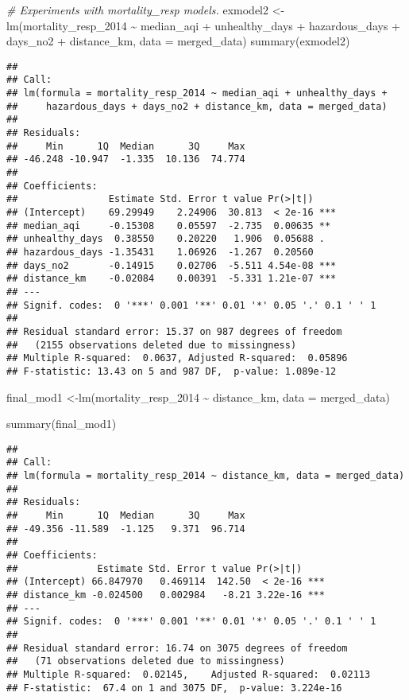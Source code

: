 \documentclass[
]{article}
\newenvironment{Shaded}{\begin{snugshade}}{\end{snugshade}}
\newcommand{\AttributeTok}[1]{\textcolor[rgb]{0.77,0.63,0.00}{#1}}
\newcommand{\CommentTok}[1]{\textcolor[rgb]{0.56,0.35,0.01}{\textit{#1}}}
\newcommand{\FunctionTok}[1]{\textcolor[rgb]{0.00,0.00,0.00}{#1}}
\newcommand{\NormalTok}[1]{#1}
\newcommand{\OtherTok}[1]{\textcolor[rgb]{0.56,0.35,0.01}{#1}}
\newcommand{\SpecialCharTok}[1]{\textcolor[rgb]{0.00,0.00,0.00}{#1}}
\begin{document}
\begin{Shaded}
\begin{Highlighting}[]
\CommentTok{\# Experiments with mortality\_resp models. }
\NormalTok{exmodel2 }\OtherTok{\textless{}{-}} \FunctionTok{lm}\NormalTok{(mortality\_resp\_2014 }\SpecialCharTok{\textasciitilde{}}\NormalTok{ median\_aqi }\SpecialCharTok{+}\NormalTok{ unhealthy\_days }\SpecialCharTok{+}\NormalTok{ hazardous\_days }\SpecialCharTok{+}\NormalTok{ days\_no2 }\SpecialCharTok{+}\NormalTok{ distance\_km, }\AttributeTok{data =}\NormalTok{ merged\_data)}
\FunctionTok{summary}\NormalTok{(exmodel2)}
\end{Highlighting}
\end{Shaded}

\begin{verbatim}
## 
## Call:
## lm(formula = mortality_resp_2014 ~ median_aqi + unhealthy_days + 
##     hazardous_days + days_no2 + distance_km, data = merged_data)
## 
## Residuals:
##     Min      1Q  Median      3Q     Max 
## -46.248 -10.947  -1.335  10.136  74.774 
## 
## Coefficients:
##                Estimate Std. Error t value Pr(>|t|)    
## (Intercept)    69.29949    2.24906  30.813  < 2e-16 ***
## median_aqi     -0.15308    0.05597  -2.735  0.00635 ** 
## unhealthy_days  0.38550    0.20220   1.906  0.05688 .  
## hazardous_days -1.35431    1.06926  -1.267  0.20560    
## days_no2       -0.14915    0.02706  -5.511 4.54e-08 ***
## distance_km    -0.02084    0.00391  -5.331 1.21e-07 ***
## ---
## Signif. codes:  0 '***' 0.001 '**' 0.01 '*' 0.05 '.' 0.1 ' ' 1
## 
## Residual standard error: 15.37 on 987 degrees of freedom
##   (2155 observations deleted due to missingness)
## Multiple R-squared:  0.0637, Adjusted R-squared:  0.05896 
## F-statistic: 13.43 on 5 and 987 DF,  p-value: 1.089e-12
\end{verbatim}

\begin{Shaded}
\begin{Highlighting}[]
\NormalTok{final\_mod1 }\OtherTok{\textless{}{-}}\FunctionTok{lm}\NormalTok{(mortality\_resp\_2014 }\SpecialCharTok{\textasciitilde{}}\NormalTok{ distance\_km, }\AttributeTok{data =}\NormalTok{ merged\_data)}

\FunctionTok{summary}\NormalTok{(final\_mod1)}
\end{Highlighting}
\end{Shaded}

\begin{verbatim}
## 
## Call:
## lm(formula = mortality_resp_2014 ~ distance_km, data = merged_data)
## 
## Residuals:
##     Min      1Q  Median      3Q     Max 
## -49.356 -11.589  -1.125   9.371  96.714 
## 
## Coefficients:
##              Estimate Std. Error t value Pr(>|t|)    
## (Intercept) 66.847970   0.469114  142.50  < 2e-16 ***
## distance_km -0.024500   0.002984   -8.21 3.22e-16 ***
## ---
## Signif. codes:  0 '***' 0.001 '**' 0.01 '*' 0.05 '.' 0.1 ' ' 1
## 
## Residual standard error: 16.74 on 3075 degrees of freedom
##   (71 observations deleted due to missingness)
## Multiple R-squared:  0.02145,    Adjusted R-squared:  0.02113 
## F-statistic:  67.4 on 1 and 3075 DF,  p-value: 3.224e-16
\end{verbatim}
\end{document}
